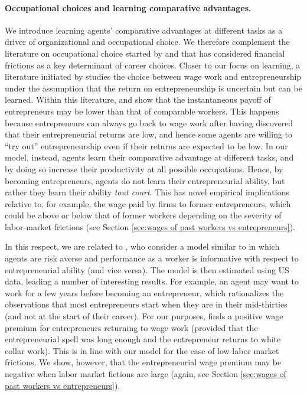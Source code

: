 \documentclass[12pt,american]{paper}
\theoremstyle{remark}
\begin{document}
\paragraph{Occupational choices and learning comparative advantages.} 
We introduce learning agents' comparative advantages at different tasks as a driver of organizational and occupational choice. We therefore complement the literature on occupational choice started by \cite{Banerjee1993} and \cite{Galor1993} that has considered financial frictions as a key determinant of career choices. Closer to our focus on learning, a literature initiated by \cite{vereshchagina2009risk}  studies the choice between wage work and entrepreneurship under the assumption that the return on entrepreneurship is uncertain but can be learned.  Within this literature, \cite{manso2016experimentation} and \cite{NBERw23168} show that the instantaneous payoff of entrepreneurs may be lower than that of comparable workers. This happens because entrepreneurs can always go back to wage work after having discovered that their entrepreneurial returns are low, and hence some agents are willing to ``try out'' entrepreneurship even if their returns are expected to be low. In our model, instead, agents learn their comparative advantage at different tasks, and by doing so increase their productivity at all possible occupations. Hence, by becoming entrepreneurs, agents do not learn their entrepreneurial ability, but rather they learn their ability \emph{tout court}. This has novel empirical implications relative to, for example,  the wage paid by firms to former entrepreneurs, which could be above or below that of  former workers depending on the severity of labor-market frictions (see Section \ref{sec:wages of past workers vs entrepreneurs}).

In this respect, we are related to  \cite{Hincapie2020}, who consider a model similar to \cite{NBERw23168} in which agents are risk averse and performance as a worker is informative with respect to entrepreneurial ability (and vice versa). The model is then estimated using US data, leading a number of interesting results. For example, an agent may want to work for a few years before becoming an entrepreneur, which rationalizes the observations that most entrepreneurs start when they are in their mid-thirties (and not at the start of their career). For our purposes, \cite{Hincapie2020} finds a positive wage premium for entrepreneurs returning to wage work (provided that the entrepreneurial spell was long enough and the entrepreneur returns to white collar work). This is in line with our model for the case of low labor market frictions. We show, however, that the entrepreneurial wage premium may be negative when labor market fictions are large (again, see Section \ref{sec:wages of past workers vs entrepreneurs}).%
\end{document}
